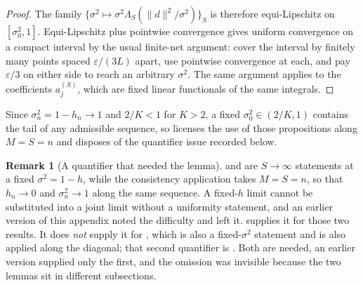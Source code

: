 \documentclass[11pt]{article}
\theoremstyle{definition}
\newtheorem{remark}[remark]{Remark}
\begin{document}
\begin{proof}
The family $\{\sigma^2\mapsto\sigma^2\Lambda_S(\lVert d\rVert^2/\sigma^2)\}_S$ is therefore equi-Lipschitz on $[\sigma_0^2,1]$. Equi-Lipschitz plus pointwise convergence gives uniform convergence on a compact interval by the usual finite-net argument: cover the interval by finitely many points spaced $\varepsilon/(3L)$ apart, use pointwise convergence at each, and pay $\varepsilon/3$ on either side to reach an arbitrary $\sigma^2$. The same argument applies to the coefficients $a_j^{(S)}$, which are fixed linear functionals of the same integrals.
\end{proof}

Since $\sigma_n^2=1-h_n\to1$ and $2/K<1$ for $K>2$, a fixed $\sigma_0^2\in(2/K,1)$ contains the tail of any admissible sequence, so  licenses the use of those propositions along $M=S=n$ and disposes of the quantifier issue recorded below.

\begin{remark}[A quantifier that needed the lemma]\label{rem:sigma_uniformity}
 and  are $S\to\infty$ statements at a fixed $\sigma^2=1-h$, while the consistency application takes $M=S=n$, so that $h_n\to0$ and $\sigma_n^2\to1$ along the same sequence. A fixed-$h$ limit cannot be substituted into a joint limit without a uniformity statement, and an earlier version of this appendix noted the difficulty and left it.  supplies it for those two results. It does \emph{not} supply it for , which is also a fixed-$\sigma^2$ statement and is also applied along the diagonal; that second quantifier is . Both are needed, an earlier version supplied only the first, and the omission was invisible because the two lemmas sit in different subsections.
\end{remark}
\end{document}
